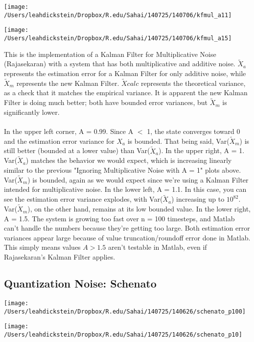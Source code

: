 \documentclass[leqno,twocolumn]{article}
\begin{document}
\begin{minipage}[c]{0.5\textwidth}
\texttt{[image: /Users/leahdickstein/Dropbox/R.edu/Sahai/140725/140706/kfmul\_a11]}
\end{minipage}
\begin{minipage}[c]{0.5\textwidth}
\texttt{[image: /Users/leahdickstein/Dropbox/R.edu/Sahai/140725/140706/kfmul\_a15]}
\end{minipage}

This is the implementation of a Kalman Filter for Multiplicative Noise (Rajasekaran) with a system that has both multiplicative and additive noise. $\tilde{X}_a$ represents the estimation error for a Kalman Filter for only additive noise, while $\tilde{X}_m$ represents the new Kalman Filter. $\tilde{X}calc$ represents the theoretical variance, as a check that it matches the empirical variance. It is apparent the new Kalman Filter is doing much better; both have bounded error variances, but $\tilde{X}_m$ is significantly lower.\\\\
In the upper left corner, A = 0.99. Since A $<$ 1, the state converges toward 0 and the estimation error variance for $X_a$ is bounded. That being said, Var($\tilde{X}_m$) is still better (bounded at a lower value) than Var($\tilde{X}_a$). In the upper right, A = 1. Var($\tilde{X}_a$) matches the behavior we would expect, which is increasing linearly similar to the previous "Ignoring Multiplicative Noise with A = 1" plots above. Var($\tilde{X}_m$) is bounded, again as we would expect since we're using a Kalman Filter intended for multiplicative noise. In the lower left, A = 1.1. In this case, you can see the estimation error variance explodes, with Var($\tilde{X}_a$) increasing up to $10^82$. Var($\tilde{X}_m$), on the other hand, remains at its low bounded value. In the lower right, A = 1.5. The system is growing too fast over n = 100 timesteps, and Matlab can't handle the numbers because they're getting too large. Both estimation error variances appear large because of value truncation/roundoff error done in Matlab. This simply means values $A > 1.5$ aren't testable in Matlab, even if Rajasekaran's Kalman Filter applies.

\subsection{Quantization Noise: Schenato}
\begin{minipage}[c]{0.5\textwidth}
\texttt{[image: /Users/leahdickstein/Dropbox/R.edu/Sahai/140725/140626/schenato\_p100]}
\end{minipage}
\begin{minipage}[c]{0.5\textwidth}
\texttt{[image: /Users/leahdickstein/Dropbox/R.edu/Sahai/140725/140626/schenato\_p10]}
\end{minipage}
\end{document}
